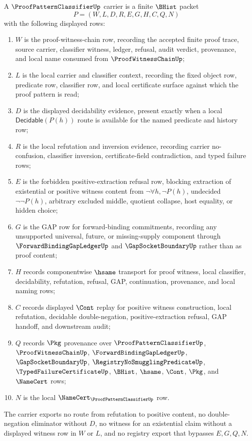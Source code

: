 \begin{definition}
\label{def:proof-pattern-classifier-carrier}
A $\ProofPatternClassifierUp$ carrier is a finite $\BHist$ packet
$$
P=(W,L,D,R,E,G,H,C,Q,N)
$$
with the following displayed rows:
\begin{enumerate}
\item $W$ is the proof-witness-chain row, recording the accepted finite proof trace, source carrier, classifier witness, ledger, refusal, audit verdict, provenance, and local name consumed from $\ProofWitnessChainUp$;
\item $L$ is the local carrier and classifier context, recording the fixed object row, predicate row, classifier row, and local certificate surface against which the proof pattern is read;
\item $D$ is the displayed decidability evidence, present exactly when a local $\mathsf{Decidable}(P(h))$ route is available for the named predicate and history row;
\item $R$ is the local refutation and inversion evidence, recording carrier no-confusion, classifier inversion, certificate-field contradiction, and typed failure rows;
\item $E$ is the forbidden positive-extraction refusal row, blocking extraction of existential or positive witness content from $\neg\forall h,\neg P(h)$, undecided $\neg\neg P(h)$, arbitrary excluded middle, quotient collapse, host equality, or hidden choice;
\item $G$ is the GAP row for forward-binding commitments, recording any unsupported universal, future, or missing-supply component through $\ForwardBindingGapLedgerUp$ and $\GapSocketBoundaryUp$ rather than as proof content;
\item $H$ records componentwise $\hsame$ transport for proof witness, local classifier, decidability, refutation, refusal, GAP, continuation, provenance, and local naming rows;
\item $C$ records displayed $\Cont$ replay for positive witness construction, local refutation, decidable double-negation, positive-extraction refusal, GAP handoff, and downstream audit;
\item $Q$ records $\Pkg$ provenance over $\ProofPatternClassifierUp$, $\ProofWitnessChainUp$, $\ForwardBindingGapLedgerUp$, $\GapSocketBoundaryUp$, $\RegistryNoSmugglingPredicateUp$, $\TypedFailureCertificateUp$, $\BHist$, $\hsame$, $\Cont$, $\Pkg$, and $\NameCert$ rows;
\item $N$ is the local $\NameCert_{\ProofPatternClassifierUp}$ row.
\end{enumerate}
The carrier exports no route from refutation to positive content, no double-negation eliminator without $D$, no witness for an existential claim without a displayed witness row in $W$ or $L$, and no registry export that bypasses $E,G,Q,N$.
\end{definition}

